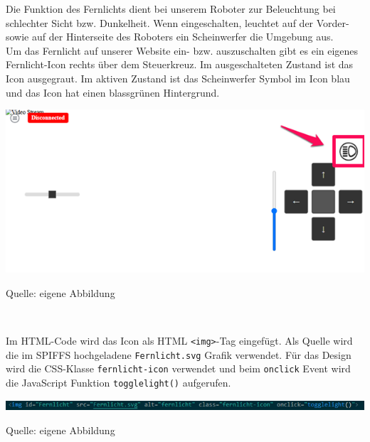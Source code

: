 \documentclass[ngerman,12pt,a4paper]{article}
\begin{document}
	Die Funktion des Fernlichts dient bei unserem Roboter zur Beleuchtung bei schlechter Sicht bzw. Dunkelheit. Wenn eingeschalten, leuchtet auf der Vorder- sowie auf der Hinterseite des Roboters ein Scheinwerfer die Umgebung aus. \\[0.5cm]
	Um das Fernlicht auf unserer Website ein- bzw. auszuschalten gibt es ein eigenes Fernlicht-Icon rechts über dem Steuerkreuz. Im ausgeschalteten Zustand ist das Icon ausgegraut. Im aktiven Zustand ist das Scheinwerfer Symbol im Icon blau und das Icon hat einen blassgrünen Hintergrund. \\[0.5cm]
	\begin{center}
		\begin{minipage}[t]{0.65\textwidth}
			\includegraphics[scale=0.6]{Pictures/fernlicht-web}
			\label{fig:fernlicht-web}
			\vspace{-10pt}
			\begin{center}
				\par\small Quelle: eigene Abbildung 
			\end{center}
		\end{minipage} \\[0.75cm]
	\end{center}
	Im HTML-Code wird das Icon als HTML \texttt{<img>}-Tag eingefügt. Als Quelle wird die im SPIFFS hochgeladene \texttt{Fernlicht.svg} Grafik verwendet. Für das Design wird die CSS-Klasse \texttt{fernlicht-icon} verwendet und beim \texttt{onclick} Event wird die JavaScript Funktion \texttt{togglelight()} aufgerufen. \\
	\begin{center}
		\begin{minipage}[t]{1\textwidth}
			\includegraphics[scale=0.9]{Pictures/fernlicht-html}
			\label{fig:fernlicht-html}
			\vspace{-10pt}
			\begin{center}
				\par\small Quelle: eigene Abbildung 
			\end{center}
		\end{minipage} \\[0.75cm]
	\end{center}
\end{document}
